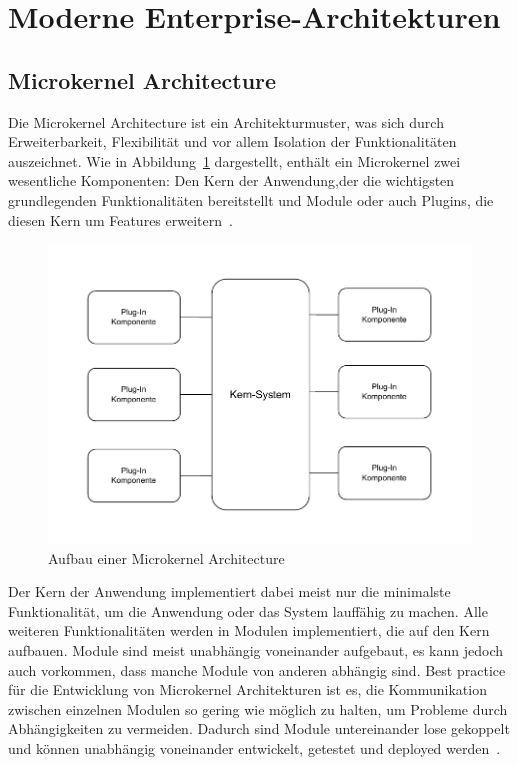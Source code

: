 \documentclass[acmtog]{acmart}
\begin{document}
\section{Moderne Enterprise-Architekturen}

\subsection{Microkernel Architecture}\label{subsec:microkernel-architecture}
Die Microkernel Architecture ist ein Architekturmuster, was sich durch Erweiterbarkeit, Flexibilität und vor allem Isolation der Funktionalitäten auszeichnet.
Wie in Abbildung~\ref{fig:microkernel} dargestellt, enthält ein Microkernel zwei wesentliche Komponenten: Den Kern der Anwendung,der die wichtigsten grundlegenden Funktionalitäten bereitstellt und Module oder auch Plugins,
die diesen Kern um Features erweitern~\cite[21-22]{architecturePatterns}.


\begin{figure}[!h]
  \centering
  \includegraphics[width=\linewidth]{images/microkernel/microkernel}
  \caption{Aufbau einer Microkernel Architecture}
  \label{fig:microkernel}
\end{figure}

Der Kern der Anwendung implementiert dabei meist nur die minimalste Funktionalität, um die Anwendung oder das System lauffähig zu machen.
Alle weiteren Funktionalitäten werden in Modulen implementiert, die auf den Kern aufbauen.
Module sind meist unabhängig voneinander aufgebaut, es kann jedoch auch vorkommen, dass manche Module von anderen abhängig sind.
Best practice für die Entwicklung von Microkernel Architekturen ist es, die Kommunikation zwischen einzelnen Modulen so gering wie möglich zu halten, um Probleme durch Abhängigkeiten zu vermeiden.
Dadurch sind Module untereinander lose gekoppelt und können unabhängig voneinander entwickelt, getestet und deployed werden~\cite[22]{architecturePatterns}.
\end{document}
